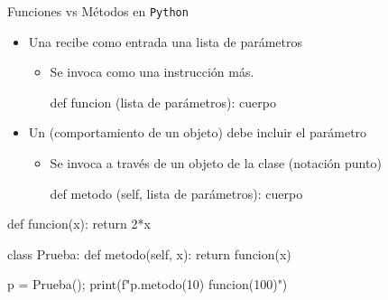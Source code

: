 \documentclass[10pt,envcountsect,spanish]{beamer}
\begin{document}
\begin{frame}[fragile=singleslide]{Funciones vs Métodos en {\tt Python}}

\begin{itemize}
\item Una  recibe como entrada una lista de parámetros 

\begin{itemize}
\item Se invoca como una instrucción más.\\[0.4em]

{\small 
\begin{pyverbatim}[][frame=single]
def funcion (lista de parámetros):
    cuerpo
\end{pyverbatim}
}
\end{itemize}


\item Un  (comportamiento de un objeto) debe incluir el parámetro 

\begin{itemize}
\item Se invoca a través de un objeto de la clase (notación punto) \\[0.4em]

{\small 
\begin{pyverbatim}[][frame=single]
def metodo (self, lista de parámetros):
    cuerpo
\end{pyverbatim}
}
 
\end{itemize}

\end{itemize}

\unEjemplo \footnotesize
\begin{pyconsole}[][frame=single]
def funcion(x):
    return 2*x

class Prueba:
    def metodo(self, x):
        return funcion(x)

p = Prueba(); print(f"{p.metodo(10)} {funcion(100)}")
\end{pyconsole}


\end{frame}
\end{document}
